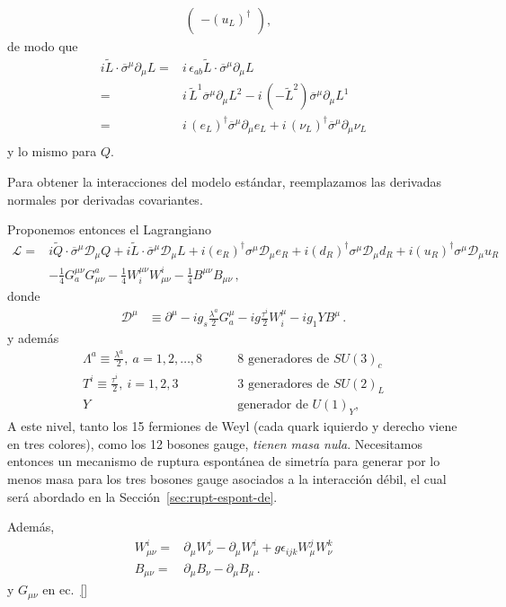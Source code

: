 \begin{frame}
\begin{align}
\begin{pmatrix}
  - \left(u_L  \right)^{\dagger}\\
  \end{pmatrix},&
\end{align}
de modo que
\begin{align*}
  i\widetilde{L}\cdot\overline{\sigma}^{\mu}\partial_{\mu}L=&
  i\,\epsilon_{ab}\widetilde{L}\cdot\overline{\sigma}^{\mu}\partial_{\mu}L \nonumber\\
 =&i\,\widetilde{L}^1\overline{\sigma}^{\mu}\partial_{\mu}L^2-i\,\left( -\widetilde{L}^2 \right)\overline{\sigma}^{\mu}\partial_{\mu}L^1    \nonumber\\
 =&i\,\left( e_L \right)^{\dagger}\overline{\sigma}^{\mu}\partial_{\mu}e_L+i\,\left( \nu_L \right)^{\dagger}\overline{\sigma}^{\mu}\partial_{\mu}\nu_L    \nonumber\\
\end{align*}
y lo mismo para $Q$.



Para obtener la interacciones del modelo estándar, reemplazamos las derivadas normales por derivadas covariantes.

Proponemos entonces el Lagrangiano
\begin{align}
\label{eq:L0}
     \mathcal{L}=&i\widetilde{Q}\cdot \overline{\sigma}^\mu\mathcal{D}_\mu Q+i\widetilde{L}\cdot \overline{\sigma}^\mu\mathcal{D}_\mu L+
i(e_R)^{\dagger}\sigma^\mu\mathcal{D}_\mu {e_R}+i(d_R)^{\dagger}\sigma^\mu\mathcal{D}_\mu d_R+i(u_R)^{\dagger}\sigma^\mu\mathcal{D}_\mu {u_R}
\nonumber\\
     &-\tfrac{1}{4}G^{\mu\nu}_a G_{\mu\nu}^a-\tfrac{1}{4}W^{\mu\nu}_i W_{\mu\nu}^i-\tfrac{1}{4}B^{\mu\nu} B_{\mu\nu}\,,
\end{align}
donde
\begin{align}
  \mathcal{D}^\mu&\equiv\partial^\mu-i g_s\frac{\lambda^a}{2}G^\mu_a-i g \frac{\tau^i}{2}W^\mu_i-i {g_1}YB^\mu\,.
\end{align}
y además
\begin{align*}
  \Lambda^a\equiv\frac{\lambda^a}{2},\ a=1,2,\ldots,8 &\qquad\text{8 generadores de $SU(3)_c$}\\
  T^i\equiv\frac{\tau^i}{2},\ i=1,2,3 &\qquad\text{3 generadores de $SU(2)_L$}\\
  Y &\qquad\text{generador de $U(1)_Y$},
\end{align*}
A este nivel, tanto los 15 fermiones de Weyl (cada quark iquierdo y derecho viene en tres colores), como los 12 bosones gauge, \emph{tienen masa nula}. Necesitamos entonces un mecanismo de ruptura espontánea de simetría para generar por lo menos masa para los tres bosones gauge asociados a la interacción débil, el cual será abordado en la Sección~\ref{sec:rupt-espont-de}.



\end{frame}
Además,
\begin{align}
  W_{\mu \nu}^i=&\partial_\mu W_\nu^i -\partial_\mu W_\mu^i+ g \epsilon_{ijk}W_\mu^j W_\nu^k \nonumber\\
  B_{\mu \nu}=&\partial_\mu B_\nu -\partial_\mu B_\mu\,.
\end{align}
y $G_{\mu\nu}$ en ec.~\eqref{}

